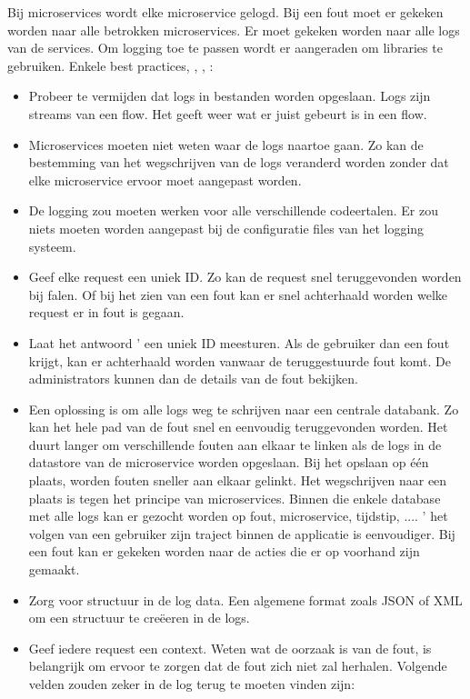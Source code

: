 Bij microservices wordt elke microservice gelogd. Bij een fout moet er gekeken worden naar alle betrokken microservices. Er moet gekeken worden naar alle logs van de services. Om logging toe te passen wordt er aangeraden om libraries te gebruiken. Enkele best practices, \textcite{Melendez2018}, \textcite{Eyee2018}, \textcite{Timms2018}:
\begin{itemize}
	\item Probeer te vermijden dat logs in bestanden worden opgeslaan. Logs zijn streams van een flow. Het geeft  weer wat er juist gebeurt is in een flow.
	\item Microservices moeten niet  weten waar de logs naartoe gaan. Zo kan de bestemming van het  wegschrijven van de logs veranderd worden zonder dat elke microservice ervoor moet aangepast worden.
	\item De logging zou moeten  werken voor alle verschillende codeertalen. Er zou niets moeten worden aangepast bij de configuratie files van het logging systeem.
	\item Geef elke request een uniek ID. Zo kan de request snel teruggevonden worden bij falen. Of bij het zien van een fout kan er snel achterhaald worden  welke request er in fout is gegaan. 
	\item Laat het antwoord ' een uniek ID meesturen. Als de gebruiker dan een fout krijgt, kan er achterhaald worden vanwaar de teruggestuurde fout komt. De administrators kunnen dan de details van de fout bekijken.
	\item Een oplossing is om alle logs  weg te schrijven naar een centrale databank. Zo kan het hele pad van de fout snel en eenvoudig teruggevonden worden. Het duurt langer om verschillende fouten aan elkaar te linken als de logs in de datastore van de microservice worden opgeslaan. Bij het opslaan op één plaats, worden fouten sneller aan elkaar gelinkt. Het  wegschrijven naar een plaats is tegen het principe van microservices. Binnen die enkele database met alle logs kan er gezocht worden op fout, microservice, tijdstip, .... ' het volgen van een gebruiker zijn traject binnen de applicatie is eenvoudiger. Bij een fout kan er gekeken worden naar de acties die er op voorhand zijn gemaakt. 
	\item Zorg voor structuur in de log data. Een algemene format zoals JSON of XML om een structuur te creëeren in de logs. 
	\item Geef iedere request een context.  Weten wat de oorzaak is van de fout, is belangrijk om ervoor te zorgen dat de fout zich niet zal herhalen. Volgende velden zouden zeker in de log terug te moeten vinden zijn:

\end{itemize}
